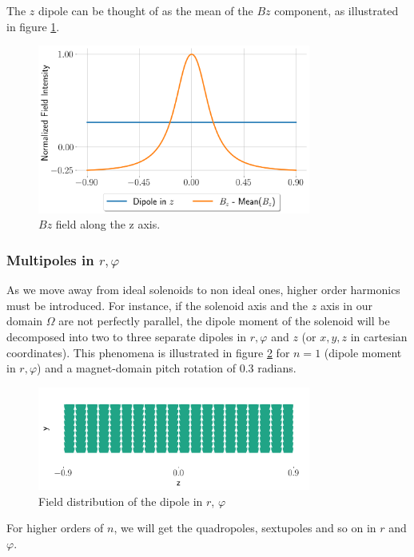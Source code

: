 The $z$ dipole can be thought of as the mean of the $Bz$
component, as illustrated in figure \ref{fig:solfundipplot}.

\begin{figure}[!h]
    \centering
    \includegraphics[width=0.8\textwidth]{figs/solfundipplot.png}
    \caption{$Bz$ field along the z axis.}
    \label{fig:solfundipplot}
\end{figure}

\subsubsection{Multipoles in $r, \varphi$}
As we move away from ideal solenoids to non ideal ones,
higher order harmonics must be introduced. For instance,
if the solenoid axis and the $z$ axis in our domain $\Omega$
are not perfectly parallel, the dipole moment of the solenoid
will be decomposed into two to three separate dipoles in
$r, \varphi$ and $z$ (or $x,y,z$ in cartesian coordinates).
This phenomena is illustrated in figure \ref{fig:rphidip}
for $n=1$ (dipole moment in $r, \varphi$) and a
magnet-domain pitch rotation of 0.3 radians.

\begin{figure}[!h]
    \centering
    \includegraphics[width=0.8\textwidth]{figs/rphidip.png}
    \caption{Field distribution of the dipole in $r$, $\varphi$}
    \label{fig:rphidip}
\end{figure}

For higher orders of $n$, we will get the quadropoles, sextupoles
and so on in $r$ and $\varphi$.

